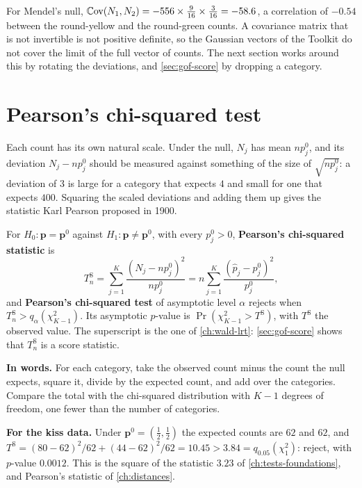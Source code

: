 For Mendel's null, $\operatorname*{\mathbb{C}\text{ov}}(N_1, N_2) = -556 \times \frac{9}{16} \times \frac{3}{16} = -58.6$, a correlation of $-0.54$ between the round-yellow and the round-green counts.
A covariance matrix that is not invertible is not positive definite, so the Gaussian vectors of the Toolkit  do not cover the limit of the full vector of counts.
The next section works around this by rotating the deviations, and \cref{sec:gof-score} by dropping a category.

\section{Pearson's chi-squared test}
\label{sec:gof-pearson}

Each count has its own natural scale.
Under the null, $N_j$ has mean $np^0_j$, and its deviation $N_j - np^0_j$ should be measured against something of the size of $\sqrt{np^0_j}$: a deviation of $3$ is large for a category that expects $4$ and small for one that expects $400$.
Squaring the scaled deviations and adding them up gives the statistic Karl Pearson proposed in 1900.

\begin{definition}
\label{def:pearson}
For $H_0: \mathbf{p} = \mathbf{p}^0$ against $H_1: \mathbf{p} \neq \mathbf{p}^0$, with every $p^0_j > 0$, \textbf{Pearson's chi-squared statistic} is
\[
T^{\mathrm{S}}_n = \sum_{j=1}^K \frac{(N_j - np^0_j)^2}{np^0_j} = n\sum_{j=1}^K\frac{(\hat{p}_j - p^0_j)^2}{p^0_j},
\]
and \textbf{Pearson's chi-squared test} of asymptotic level $\alpha$ rejects when $T^{\mathrm{S}}_n > q_\alpha(\chi^2_{K-1})$.
Its asymptotic $p$-value is $\Pr(\chi^2_{K-1} > T^{\mathrm{S}})$, with $T^{\mathrm{S}}$ the observed value.
The superscript is the one of \cref{ch:wald-lrt}: \cref{sec:gof-score} shows that $T^{\mathrm{S}}_n$ is a score statistic.
\end{definition}

\begin{inwords}
\textbf{In words.} For each category, take the observed count minus the count the null expects, square it, divide by the expected count, and add over the categories. Compare the total with the chi-squared distribution with $K - 1$ degrees of freedom, one fewer than the number of categories.
\par\smallskip
\textbf{For the kiss data.} Under $\mathbf{p}^0 = (\frac12, \frac12)$ the expected counts are $62$ and $62$, and $T^{\mathrm{S}} = (80 - 62)^2/62 + (44 - 62)^2/62 = 10.45 > 3.84 = q_{0.05}(\chi^2_1)$: reject, with $p$-value $0.0012$. This is the square of the statistic $3.23$ of \cref{ch:tests-foundations}, and Pearson's statistic of \cref{ch:distances}.
\end{inwords}

